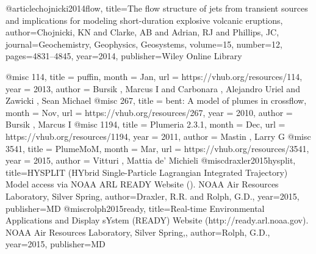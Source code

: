 @article{chojnicki2014flow,
  title={The flow structure of jets from transient sources and implications for modeling short-duration explosive volcanic eruptions},
  author={Chojnicki, KN and Clarke, AB and Adrian, RJ and Phillips, JC},
  journal={Geochemistry, Geophysics, Geosystems},
  volume={15},
  number={12},
  pages={4831--4845},
  year={2014},
  publisher={Wiley Online Library}
}

@misc { 114,
	title = {puffin},
	month = {Jan},
	url = {https://vhub.org/resources/114},
	year = {2013},
	author = {Bursik , Marcus I and Carbonara , Alejandro Uriel and Zawicki , Sean Michael}
}
@misc { 267,
	title = {bent: A model of plumes in crossflow},
	month = {Nov},
	url = {https://vhub.org/resources/267},
	year = {2010},
	author = {Bursik , Marcus I}
}
@misc { 1194,
	title = {Plumeria 2.3.1},
	month = {Dec},
	url = {https://vhub.org/resources/1194},
	year = {2011},
	author = {Mastin , Larry G}
}
@misc { 3541,
	title = {PlumeMoM},
	month = {Mar},
	url = {https://vhub.org/resources/3541},
	year = {2015},
	author = {Vitturi , Mattia de' Michieli}
}
@misc{draxler2015hysplit,
  title={HYSPLIT (HYbrid Single-Particle Lagrangian Integrated Trajectory) Model access via NOAA ARL READY Website (). NOAA Air Resources Laboratory, Silver Spring},
  author={Draxler, R.R. and Rolph, G.D.},
  year={2015},
  publisher={MD}
}
@misc{rolph2015ready,
  title={Real-time Environmental Applications and Display sYstem (READY) Website (http://ready.arl.noaa.gov). NOAA Air Resources Laboratory, Silver Spring,},
  author={Rolph, G.D.},
  year={2015},
  publisher={MD}
}

